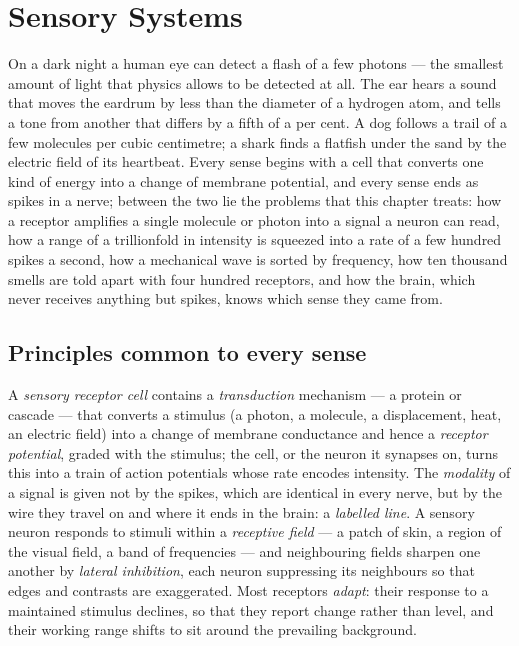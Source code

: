 \chapter{Sensory Systems}\label{ch:b3:sensory-systems}

On a dark night a human eye can detect a flash of a few photons ---
the smallest amount of light that physics allows to be detected at all.
The ear hears a sound that moves the eardrum by less than the diameter
of a hydrogen atom, and tells a tone from another that differs by a
fifth of a per cent. A dog follows a trail of a few molecules per
cubic centimetre; a shark finds a flatfish under the sand by the
electric field of its heartbeat. Every sense begins with a cell that
converts one kind of energy into a change of membrane potential, and
every sense ends as spikes in a nerve; between the two lie the
problems that this chapter treats: how a receptor amplifies a single
molecule or photon into a signal a neuron can read, how a range of a
trillionfold in intensity is squeezed into a rate of a few hundred
spikes a second, how a mechanical wave is sorted by frequency, how
ten thousand smells are told apart with four hundred receptors, and
how the brain, which never receives anything but spikes, knows which
sense they came from.

\section{Principles common to every sense}

\begin{definition}\label{def:b3:sensory-systems:principles}
A \emph{sensory receptor cell} contains a \emph{transduction} mechanism
--- a protein or cascade --- that converts a stimulus (a photon, a
molecule, a displacement, heat, an electric field) into a change of
membrane conductance and hence a \emph{receptor potential}, graded with
the stimulus; the cell, or the neuron it synapses on, turns this into a
train of action potentials whose rate encodes intensity. The
\emph{modality} of a signal is given not by the spikes, which are
identical in every nerve, but by the wire they travel on and where it
ends in the brain: a \emph{labelled line}. A sensory neuron responds to
stimuli within a \emph{receptive field} --- a patch of skin, a region of
the visual field, a band of frequencies --- and neighbouring fields
sharpen one another by \emph{lateral inhibition}, each neuron
suppressing its neighbours so that edges and contrasts are exaggerated.
Most receptors \emph{adapt}: their response to a maintained stimulus
declines, so that they report change rather than level, and their
working range shifts to sit around the prevailing background.
\end{definition}

